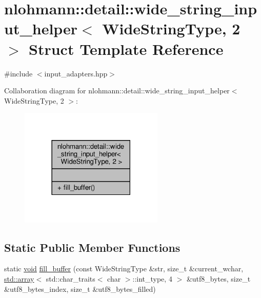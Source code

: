 \hypertarget{structnlohmann_1_1detail_1_1wide__string__input__helper_3_01_wide_string_type_00_012_01_4}{}\section{nlohmann\+:\+:detail\+:\+:wide\+\_\+string\+\_\+input\+\_\+helper$<$ Wide\+String\+Type, 2 $>$ Struct Template Reference}
\label{structnlohmann_1_1detail_1_1wide__string__input__helper_3_01_wide_string_type_00_012_01_4}


{\ttfamily \#include $<$input\+\_\+adapters.\+hpp$>$}



Collaboration diagram for nlohmann\+:\+:detail\+:\+:wide\+\_\+string\+\_\+input\+\_\+helper$<$ Wide\+String\+Type, 2 $>$\+:
\nopagebreak
\begin{figure}[H]
\begin{center}
\leavevmode
\includegraphics[width=194pt]{structnlohmann_1_1detail_1_1wide__string__input__helper_3_01_wide_string_type_00_012_01_4__coll__graph}
\end{center}
\end{figure}
\subsection*{Static Public Member Functions}
\begin{DoxyCompactItemize}
\item 
static \hyperlink{namespacenlohmann_1_1detail_a59fca69799f6b9e366710cb9043aa77d}{void} \hyperlink{structnlohmann_1_1detail_1_1wide__string__input__helper_3_01_wide_string_type_00_012_01_4_a7ede7749f186f1a6a46c08abb607fd5c}{fill\+\_\+buffer} (const Wide\+String\+Type \&str, size\+\_\+t \&current\+\_\+wchar, \hyperlink{namespacenlohmann_1_1detail_a1ed8fc6239da25abcaf681d30ace4985af1f713c9e000f5d3f280adbd124df4f5}{std\+::array}$<$ std\+::char\+\_\+traits$<$ char $>$\+::int\+\_\+type, 4 $>$ \&utf8\+\_\+bytes, size\+\_\+t \&utf8\+\_\+bytes\+\_\+index, size\+\_\+t \&utf8\+\_\+bytes\+\_\+filled)
\end{DoxyCompactItemize}


